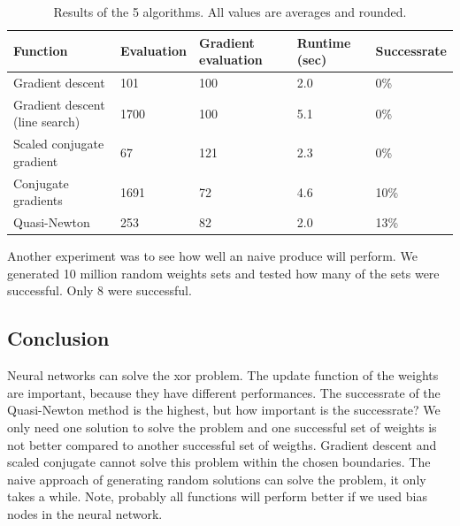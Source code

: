 \documentclass{article}
\begin{document}

\newpage
\begin{table}[H]
	\centering
	\begin{tabular}{| l | l | l | l | l |}
		\hline
		Function & Evaluation & Gradient evaluation & Runtime (sec) & Successrate \\ \hline
		Gradient descent & 101 & 100 & 2.0 & 0\% \\ \hline
		Gradient descent (line search) & 1700 & 100 & 5.1 & 0\% \\ \hline
		Scaled conjugate gradient & 67 & 121 & 2.3 & 0\% \\ \hline
		Conjugate gradients & 1691 & 72 & 4.6 & 10\% \\ \hline
		Quasi-Newton & 253 & 82 & 2.0 & 13\% \\ \hline
	\end{tabular}
	\caption{Results of the 5 algorithms. All values are averages and rounded.}
	\label{table:results}
\end{table}

Another experiment was to see how well an naive produce will perform. We generated 10 million random weights sets and tested how many of the sets were successful. Only 8 were successful. 

\subsection{Conclusion}
Neural networks can solve the xor problem. The update function of the weights are important, because they have different performances. The successrate of the Quasi-Newton method is the highest, but how important is the successrate? We only need one solution to solve the problem and one successful set of weights is not better compared to another successful set of weigths. Gradient descent and scaled conjugate cannot solve this problem within the chosen boundaries. The naive approach of generating random solutions can solve the problem, it only takes a while. Note, probably all functions will perform better if we used bias nodes in the neural network.
\end{document}
